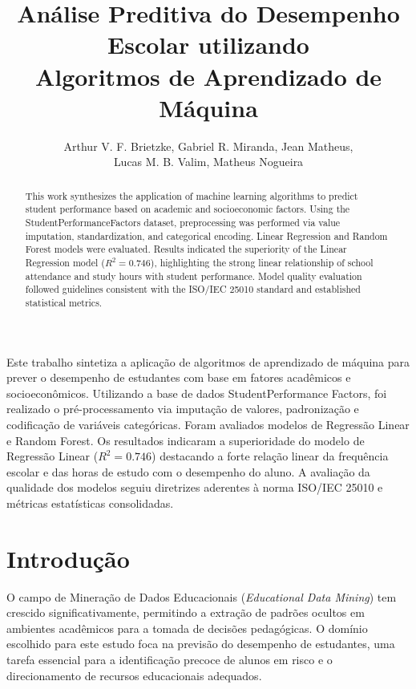 \documentclass[12pt]{article}
\title{Análise Preditiva do Desempenho Escolar utilizando\\ Algoritmos de Aprendizado de Máquina}
\author{Arthur V. F. Brietzke, Gabriel R. Miranda, Jean Matheus,\\ Lucas M. B. Valim, Matheus Nogueira}
\begin{document}
 

\maketitle

\begin{abstract}
  This work synthesizes the application of machine learning algorithms to predict student performance based on academic and socioeconomic factors. Using the StudentPerformanceFactors dataset, preprocessing was performed via value imputation, standardization, and categorical encoding. Linear Regression and Random Forest models were evaluated. Results indicated the superiority of the Linear Regression model ($R^{2}= 0.746$), highlighting the strong linear relationship of school attendance and study hours with student performance. Model quality evaluation followed guidelines consistent with the ISO/IEC 25010 standard and established statistical metrics.
\end{abstract}
     
\begin{resumo} 
  Este trabalho sintetiza a aplicação de algoritmos de aprendizado de máquina para prever o desempenho de estudantes com base em fatores acadêmicos e socioeconômicos. Utilizando a base de dados StudentPerformance Factors, foi realizado o pré-processamento via imputação de valores, padronização e codificação de variáveis categóricas. Foram avaliados modelos de Regressão Linear e Random Forest. Os resultados indicaram a superioridade do modelo de Regressão Linear ($R^{2}=0.746$) destacando a forte relação linear da frequência escolar e das horas de estudo com o desempenho do aluno. A avaliação da qualidade dos modelos seguiu diretrizes aderentes à norma ISO/IEC 25010 e métricas estatísticas consolidadas.
\end{resumo}

\section{Introdução}

O campo de Mineração de Dados Educacionais (\textit{Educational Data Mining}) tem crescido significativamente, permitindo a extração de padrões ocultos em ambientes acadêmicos para a tomada de decisões pedagógicas. O domínio escolhido para este estudo foca na previsão do desempenho de estudantes, uma tarefa essencial para a identificação precoce de alunos em risco e o direcionamento de recursos educacionais adequados.
\end{document}
